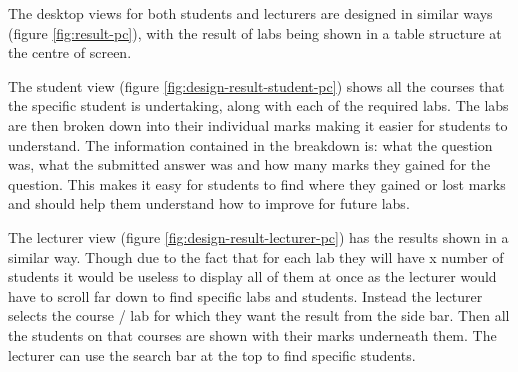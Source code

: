 \documentclass[11pt]{report}
\begin{document}
The desktop views for both students and lecturers are designed in similar ways (figure \ref{fig:result-pc}), with the result of labs being shown in a table structure at the centre of screen. 

The student view (figure \ref{fig:design-result-student-pc}) shows all the courses that the specific student is undertaking, along with each of the required labs. The labs are then broken down into their individual marks making it easier for students to understand. The information contained in the breakdown is: what the question was, what the submitted answer was and how many marks they gained for the question. This makes it easy for students to find where they gained or lost marks and should help them understand how to improve for future labs.

The lecturer view (figure \ref{fig:design-result-lecturer-pc}) has the results shown in a similar way. Though due to the fact that for each lab they will have x number of students it would be useless to display all of them at once as the lecturer would have to scroll far down to find specific labs and students. Instead the lecturer selects the course / lab for which they want the result from the side bar. Then all the students on that courses are shown with their marks underneath them. The lecturer can use the search bar at the top to find specific students.
\end{document}
